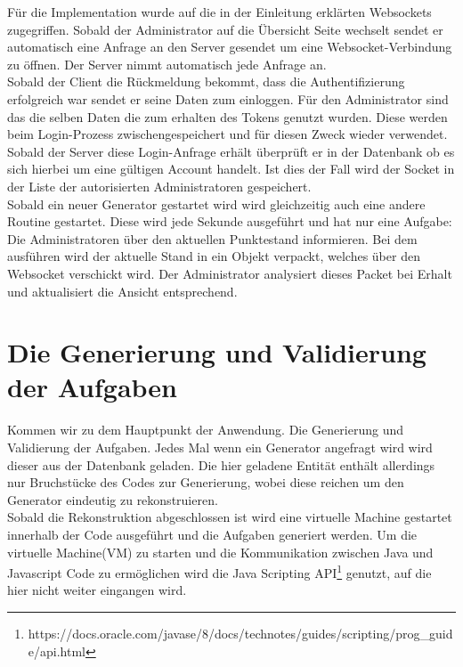 Für die Implementation wurde auf die in der Einleitung erklärten Websockets zugegriffen. Sobald der Administrator auf die Übersicht Seite wechselt sendet er automatisch eine Anfrage an den Server gesendet um eine Websocket-Verbindung zu öffnen. Der Server nimmt automatisch jede Anfrage an. \\
Sobald der Client die Rückmeldung bekommt, dass die Authentifizierung erfolgreich war sendet er seine Daten zum einloggen. Für den Administrator sind das die selben Daten die zum erhalten des Tokens genutzt wurden. Diese werden beim Login-Prozess zwischengespeichert und für diesen Zweck wieder verwendet. \\
Sobald der Server diese Login-Anfrage erhält überprüft er in der Datenbank ob es sich hierbei um eine gültigen Account handelt. Ist dies der Fall wird der Socket in der Liste der autorisierten Administratoren gespeichert. \\

Sobald ein neuer Generator gestartet wird wird gleichzeitig auch eine andere Routine gestartet. Diese wird jede Sekunde ausgeführt und hat nur eine Aufgabe: Die Administratoren über den aktuellen Punktestand informieren. Bei dem ausführen wird der aktuelle Stand in ein Objekt verpackt, welches über den Websocket verschickt wird. Der Administrator analysiert dieses Packet bei Erhalt und aktualisiert die Ansicht entsprechend.


\section{Die Generierung und Validierung der Aufgaben}

Kommen wir zu dem Hauptpunkt der Anwendung. Die Generierung und Validierung der Aufgaben. Jedes Mal wenn ein Generator angefragt wird wird dieser aus der Datenbank geladen. Die hier geladene Entität enthält allerdings nur Bruchstücke des Codes zur Generierung, wobei diese reichen um den Generator eindeutig zu rekonstruieren.\\
Sobald die Rekonstruktion abgeschlossen ist wird eine virtuelle Machine gestartet innerhalb der Code ausgeführt und die Aufgaben generiert werden. Um die virtuelle Machine(VM) zu starten und die Kommunikation zwischen Java und Javascript Code zu ermöglichen wird die Java Scripting API\footnote{https://docs.oracle.com/javase/8/docs/technotes/guides/scripting/prog_guide/api.html} genutzt, auf die hier nicht weiter eingangen wird. \\

